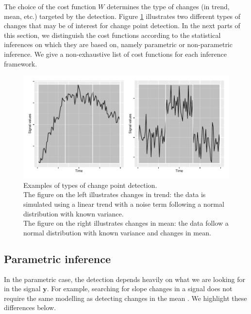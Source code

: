 The choice of the cost function $W$ determines the type of changes (in trend, mean, etc.) targeted by the detection. Figure \ref{fig:ex_cp} illustrates two different types of changes that may be of interest for change point detection. In the next parts of this section, we distinguish the cost functions according to the statistical inferences on which they are based on, namely parametric or non-parametric inference. We give a non-exhaustive list of cost functions for each inference framework.

\begin{figure}[ht]
    \centering
    \includegraphics{figs/Chap2/Ex_CP_cost.pdf}
    \caption{Examples of types of change point detection. \\
    The figure on the left illustrates changes in trend: the data is simulated using a linear trend with a noise term following a normal distribution with known variance.\\
    The figure on the right illustrates changes in mean: the data follow a normal distribution with known variance and changes in mean.}
    \label{fig:ex_cp}
\end{figure}

\subsection{Parametric inference}

In the parametric case, the detection depends heavily on what we are looking for in the signal $\bm y$. For example, searching for slope changes in a signal \citep{Bai1994,Fearnhead2018} does not require the same modelling as detecting changes in the mean \citep{Frick2014,chen2012parametric}. We highlight these differences below.

